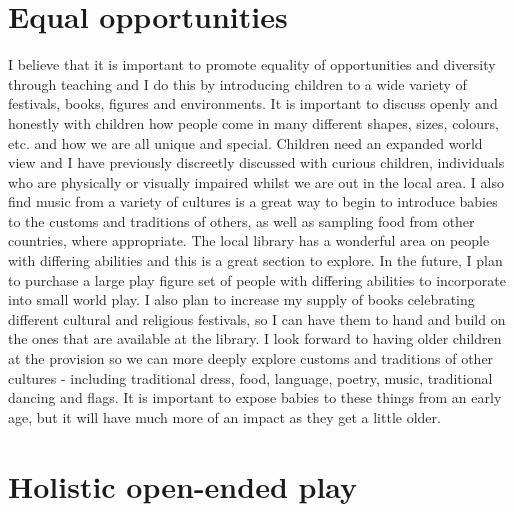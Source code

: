 \documentclass[10pt,a4paper]{report}
\begin{document}
\section{Equal opportunities}

I believe that it is important to promote equality of opportunities and diversity through teaching and I do this by introducing children to a wide variety of festivals, books, figures and environments. It is important to discuss openly and honestly with children how people come in many different shapes, sizes, colours, etc. and how we are all unique and special. Children need an expanded world view and I have previously discreetly discussed with curious children, individuals who are physically or visually impaired whilst we are out in the local area. I also find music from a variety of cultures is a great way to begin to introduce babies to the customs and traditions of others, as well as sampling food from other countries, where appropriate. The local library has a wonderful area on people with differing abilities and this is a great section to explore. In the future, I plan to purchase a large play figure set of people with differing abilities to incorporate into small world play. I also plan to increase my supply of books celebrating different cultural and religious festivals, so I can have them to hand and build on the ones that are available at the library. I look forward to having older children at the provision so we can more deeply explore customs and traditions of other cultures - including traditional dress, food, language, poetry, music, traditional dancing and flags. It is important to expose babies to these things from an early age, but it will have much more of an impact as they get a little older. 

\section{Holistic open-ended play}
\end{document}

